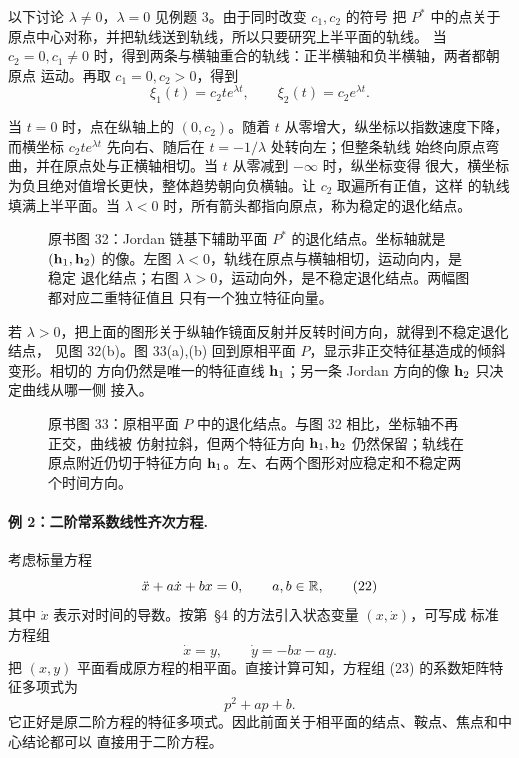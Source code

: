以下讨论 \(\lambda\neq0\)，\(\lambda=0\) 见例题 3。由于同时改变 \(c_1,c_2\) 的符号
把 \(P^*\) 中的点关于原点中心对称，并把轨线送到轨线，所以只要研究上半平面的轨线。
当 \(c_2=0,c_1\neq0\) 时，得到两条与横轴重合的轨线：正半横轴和负半横轴，两者都朝原点
运动。再取 \(c_1=0,c_2>0\)，得到
\begin{equation}
 \xi_1(t)=c_2te^{\lambda t},\qquad
 \xi_2(t)=c_2e^{\lambda t}.
 \tag{21}
\end{equation}

当 \(t=0\) 时，点在纵轴上的 \((0,c_2)\)。随着 \(t\) 从零增大，纵坐标以指数速度下降，
而横坐标 \(c_2te^{\lambda t}\) 先向右、随后在 \(t=-1/\lambda\) 处转向左；但整条轨线
始终向原点弯曲，并在原点处与正横轴相切。当 \(t\) 从零减到 \(-\infty\) 时，纵坐标变得
很大，横坐标为负且绝对值增长更快，整体趋势朝向负横轴。让 \(c_2\) 取遍所有正值，这样
的轨线填满上半平面。当 \(\lambda<0\) 时，所有箭头都指向原点，称为稳定的退化结点。

\begin{figure}[H]
 \centering
 
 \caption{原书图 32：Jordan 链基下辅助平面 \(P^*\) 的退化结点。坐标轴就是
 \((\vect{h}_1,\vect{h}_2)\) 的像。左图 \(\lambda<0\)，轨线在原点与横轴相切，运动向内，是稳定
 退化结点；右图 \(\lambda>0\)，运动向外，是不稳定退化结点。两幅图都对应二重特征值且
 只有一个独立特征向量。}
 \label{fig:ch2-p2-32}
\end{figure}

若 \(\lambda>0\)，把上面的图形关于纵轴作镜面反射并反转时间方向，就得到不稳定退化结点，
见图 32(b)。图 33(a),(b) 回到原相平面 \(P\)，显示非正交特征基造成的倾斜变形。相切的
方向仍然是唯一的特征直线 \(\vect{h}_1\)；另一条 Jordan 方向的像 \(\vect{h}_2\) 只决定曲线从哪一侧
接入。

\begin{figure}[H]
 \centering
 
 \caption{原书图 33：原相平面 \(P\) 中的退化结点。与图 32 相比，坐标轴不再正交，曲线被
 仿射拉斜，但两个特征方向 \(\vect{h}_1,\vect{h}_2\) 仍然保留；轨线在原点附近仍切于特征方向
 \(\vect{h}_1\)。左、右两个图形对应稳定和不稳定两个时间方向。}
 \label{fig:ch2-p2-33}
\end{figure}

\paragraph{例 2：二阶常系数线性齐次方程.}
考虑标量方程
\begin{equation}
 \ddot x+a\dot x+bx=0,
 \qquad a,b\in\mathbb R,
 \tag{22}
\end{equation}
其中 \(\dot x\) 表示对时间的导数。按第~\S4 的方法引入状态变量 \((x,\dot x)\)，可写成
标准方程组
\begin{equation}
 \dot x=y,\qquad
 \dot y=-bx-ay.
 \tag{23}
\end{equation}
把 \((x,y)\) 平面看成原方程的相平面。直接计算可知，方程组 (23)
的系数矩阵特征多项式为
\begin{equation}
 p^2+ap+b.
 \tag{24}
\end{equation}
它正好是原二阶方程的特征多项式。因此前面关于相平面的结点、鞍点、焦点和中心结论都可以
直接用于二阶方程。

